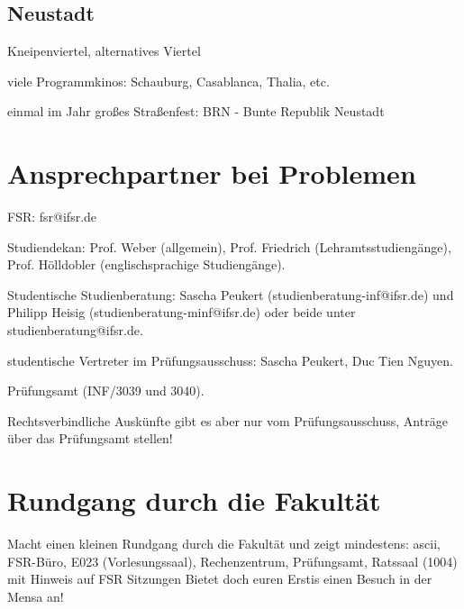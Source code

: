 \documentclass[a4paper,12pt]{report}
\begin{document}
\subsection{Neustadt}
\begin{itemize*}
	\item Kneipenviertel, alternatives Viertel
	\item viele Programmkinos: Schauburg, Casablanca, Thalia, etc.
	\item einmal im Jahr großes Straßenfest: BRN - Bunte Republik Neustadt
\end{itemize*}

\section{Ansprechpartner bei Problemen}
\begin{itemize*}
	\item FSR: fsr@ifsr.de
	\item Studiendekan: Prof. Weber (allgemein), Prof. Friedrich (Lehramtsstudiengänge), Prof. Hölldobler (englischsprachige Studiengänge).
	\item Studentische Studienberatung: Sascha Peukert (studienberatung-inf@ifsr.de) und Philipp Heisig (studienberatung-minf@ifsr.de) oder beide unter studienberatung@ifsr.de.
	\item studentische Vertreter im Prüfungsausschuss: Sascha Peukert, Duc Tien Nguyen.
	\item Prüfungsamt (INF/3039 und 3040).
	\item Rechtsverbindliche Auskünfte gibt es aber nur vom Prüfungsausschuss, Anträge über das Prüfungsamt stellen!
\end{itemize*}

\section{Rundgang durch die Fakultät}
Macht einen kleinen Rundgang durch die Fakultät und zeigt mindestens: ascii, FSR-Büro, E023 (Vorlesungssaal), Rechenzentrum, Prüfungsamt, Ratssaal (1004) mit Hinweis auf FSR Sitzungen
Bietet doch euren Erstis einen Besuch in der Mensa an!
\end{document}
